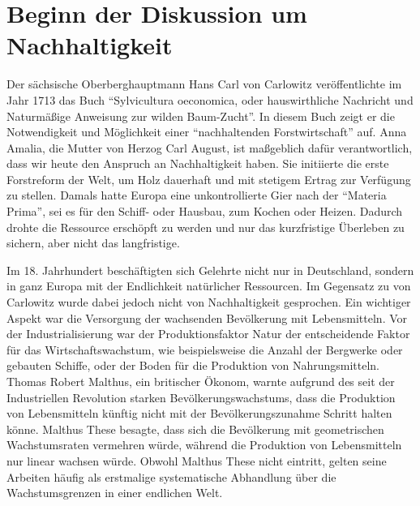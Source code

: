 \documentclass[
]{book}
\begin{document}
\hypertarget{carlowitz}{%
\section{Beginn der Diskussion um Nachhaltigkeit}\label{carlowitz}}

Der sächsische Oberberghauptmann Hans Carl von Carlowitz veröffentlichte im Jahr 1713 das Buch ``Sylvicultura oeconomica, oder hauswirthliche Nachricht und Naturmäßige Anweisung zur wilden Baum-Zucht''. In diesem Buch zeigt er die Notwendigkeit und Möglichkeit einer ``nachhaltenden Forstwirtschaft'' auf. Anna Amalia, die Mutter von Herzog Carl August, ist maßgeblich dafür verantwortlich, dass wir heute den Anspruch an Nachhaltigkeit haben. Sie initiierte die erste Forstreform der Welt, um Holz dauerhaft und mit stetigem Ertrag zur Verfügung zu stellen. Damals hatte Europa eine unkontrollierte Gier nach der ``Materia Prima'', sei es für den Schiff- oder Hausbau, zum Kochen oder Heizen. Dadurch drohte die Ressource erschöpft zu werden und nur das kurzfristige Überleben zu sichern, aber nicht das langfristige.

Im 18. Jahrhundert beschäftigten sich Gelehrte nicht nur in Deutschland, sondern in ganz Europa mit der Endlichkeit natürlicher Ressourcen. Im Gegensatz zu von Carlowitz wurde dabei jedoch nicht von Nachhaltigkeit gesprochen. Ein wichtiger Aspekt war die Versorgung der wachsenden Bevölkerung mit Lebensmitteln. Vor der Industrialisierung war der Produktionsfaktor Natur der entscheidende Faktor für das Wirtschaftswachstum, wie beispielsweise die Anzahl der Bergwerke oder gebauten Schiffe, oder der Boden für die Produktion von Nahrungsmitteln. Thomas Robert Malthus, ein britischer Ökonom, warnte aufgrund des seit der Industriellen Revolution starken Bevölkerungswachstums, dass die Produktion von Lebensmitteln künftig nicht mit der Bevölkerungszunahme Schritt halten könne. Malthus These besagte, dass sich die Bevölkerung mit geometrischen Wachstumsraten vermehren würde, während die Produktion von Lebensmitteln nur linear wachsen würde. Obwohl Malthus These nicht eintritt, gelten seine Arbeiten häufig als erstmalige systematische Abhandlung über die Wachstumsgrenzen in einer endlichen Welt.
\end{document}

